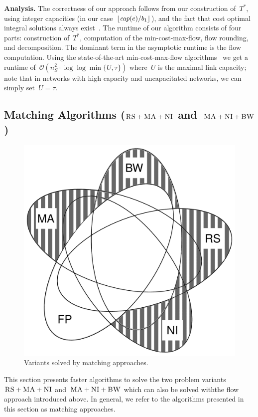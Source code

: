 \documentclass[preprint,12pt]{elsarticle}
\newcommand{\capacity}{\emph{cap}}
\newcommand{\CC}{\textsc{NI}}
\newcommand{\RS}{\textsc{RS}}
\newcommand{\BW}{\textsc{BW}}
\newcommand{\MA}{\textsc{MA}}
\newcommand{\Tree}{\ensuremath{T}}
\newcommand{\CostTrans}{\ensuremath{b_1}}
\begin{document}
\textbf{Analysis.}
The correctness of our approach follows from our construction
of~$\Tree^*$, using integer capacities (in our case~$\lfloor\capacity(e)/\CostTrans\rfloor$),
and the fact that cost optimal integral solutions always exist~\cite{flow-book}.
The runtime of our algorithm consists of four parts: construction of~$\Tree^*$,
computation of the min-cost-max-flow, flow rounding, and decomposition. The
dominant term in the asymptotic runtime is the flow computation.
Using the state-of-the-art min-cost-max-flow
algorithms~\cite{mincostmaxflow-1,mincostmaxflow-2}
we get a runtime of~$\mathcal{O}(n_S^2 \cdot \log\log \min \{U,\tau\})$
where~$U$ is the maximal link capacity; note that in networks with high capacity
and uncapacitated networks, we can simply set~$U=\tau$.


\subsection{Matching Algorithms ($\RS+\MA+\CC$ and~$\MA+\CC+\BW$)}\label{ssec:match}


\begin{figure}[t]
\centering
\includegraphics[width=0.49\columnwidth]{figs/venn_matching.pdf}
\caption{Variants solved by matching approaches.}
\vspace{-1em}
\label{fig:venn_match}
\end{figure}
This section presents faster algorithms to solve 
the two problem variants
$\RS+\MA+\CC$ and~$\MA+\CC+\BW$ which can also be solved withthe flow approach
introduced above.
In general, we refer to the algorithms presented in this section
as matching approaches.
\end{document}
